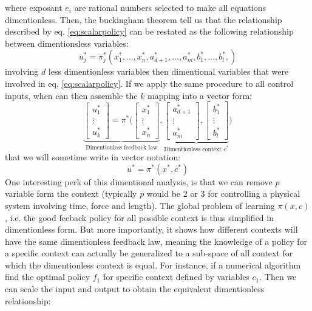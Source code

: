 where exposant $e_i$ are rational numbers selected to make all equations dimentionless. Then, the buckingham theorem tell us that the relationship described by eq. \eqref{eq:scalarpolicy} can be restated as the following relationship between  dimentionsless variables:
\begin{equation}
u_j^* = \pi_j^* \left(
x_1^*, \hdots, x_n^*, 
a_{d+1}^*, \hdots, a_{m}^*, 
b_1^*, \hdots, b_l^*, 
\right) 
\label{eq:scalardimpolicy}
\end{equation}
involving $d$ less dimentionless variables then dimentional variables that were involved in eq. \eqref{eq:scalarpolicy}. If we apply the same procedure to all control inputs, when can then assemble the $k$ mapping into a vector form:
\begin{equation}
\underbrace{
\begin{bmatrix}
u_1^* \\
\vdots \\
u_k^*
\end{bmatrix}
=
\pi^* \Biggl(
\begin{bmatrix}
x_1^* \\
\vdots \\
x_n^*
\end{bmatrix}
}_{\text{Dimentionless feedback law}}
,
\underbrace{
\begin{bmatrix}
a_{d+1}^* \\
\vdots \\
a_{m}^*
\end{bmatrix}
,
\begin{bmatrix}
b_1^* \\
\vdots \\
b_l^*
\end{bmatrix}
}_{\text{Dimentionless context $c^*$}}
\Biggr)
\label{eq:vectordimpolicy}
\end{equation}
that we will sometime write in vector notation: 
\begin{equation}
u^* = \pi^*( x^* , c^* )
\label{eq:vectordimpolicyshort}
\end{equation}
One interesting perk of this dimentional analysis, is that we can remove $p$ variable form the context (typically $p$ would be 2 or 3 for controlling a physical system involving time, force and length). The global problem of learning $\pi(x,c)$, i.e. the good feeback policy for all possible context is thus simplified in dimentionless form. But more importantly, it shows how different contexts will have the same dimentionless feedback law, meaning the knowledge of a policy for a specific context can actually be generalized to a sub-space of all context for which the dimentionless context is equal. For instance, if a numerical algorithm find the optimal policy $f_1$ for specific context defined by variables $c_1$. Then we can scale the input and output to obtain the equivalent dimentionless relationship:

